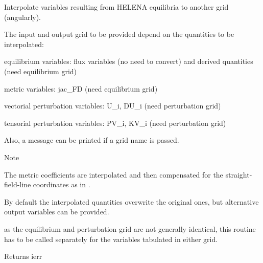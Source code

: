 Interpolate variables resulting from H\+E\+L\+E\+NA equilibria to another grid (angularly). 

The input and output grid to be provided depend on the quantities to be interpolated\+:
\begin{DoxyItemize}
\item equilibrium variables\+: flux variables (no need to convert) and derived quantities (need equilibrium grid)
\item metric variables\+: jac\+\_\+\+FD (need equilibrium grid)
\item vectorial perturbation variables\+: U\+\_\+i, D\+U\+\_\+i (need perturbation grid)
\item tensorial perturbation variables\+: P\+V\+\_\+i, K\+V\+\_\+i (need perturbation grid)
\end{DoxyItemize}

Also, a message can be printed if a grid name is passed.

\begin{DoxyNote}{Note}

\begin{DoxyEnumerate}
\item The metric coefficients are interpolated and then compensated for the straight-\/field-\/line coordinates as in \cite{Weyens3D} .
\item By default the interpolated quantities overwrite the original ones, but alternative output variables can be provided.
\item as the equilibrium and perturbation grid are not generally identical, this routine has to be called separately for the variables tabulated in either grid.
\end{DoxyEnumerate}
\end{DoxyNote}
\begin{DoxyReturn}{Returns}
ierr
\end{DoxyReturn}

